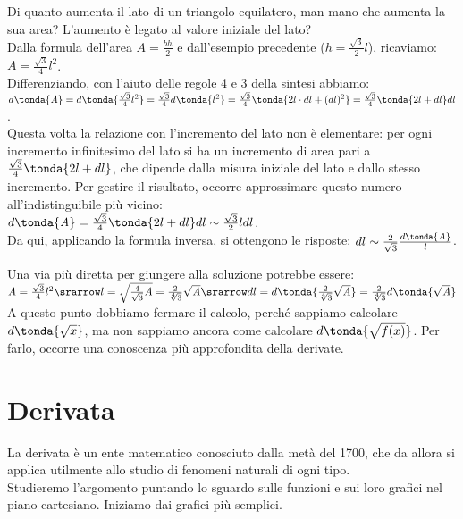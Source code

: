 \begin{esempio}
Di quanto aumenta il lato di un triangolo equilatero,
man mano che aumenta la sua area? L'aumento è legato al valore iniziale del 
lato?\\
Dalla formula dell'area $\mathit{A}=\frac{bh}{2}$ e dall'esempio precedente
($h=\frac{\sqrt{3}}{2}l$), ricaviamo: $\mathit{A}=\frac{\sqrt{3}}{4}l^2$.\\
Differenziando, con l'aiuto delle regole 4 e 3 della sintesi 
abbiamo:\\
$d\tonda{\mathit{A}}=d\tonda{\frac{\sqrt{3}}{4}l^2}=
 \frac{\sqrt{3}}{4}d\tonda{l^2}=
 \frac{\sqrt{3}}{4}\tonda{2l \cdot dl+(dl)^2}=
 \frac{\sqrt{3}}{4}\tonda{2l+dl}dl$.\\
Questa volta la relazione con l'incremento del lato non è elementare: per 
ogni 
incremento infinitesimo del lato si ha un incremento di area pari a 
$\frac{\sqrt{3}}{4}\tonda{2l+dl}$, che dipende dalla misura iniziale del lato
e dallo stesso incremento. Per gestire il risultato, occorre approssimare
questo numero all'indistinguibile più vicino:\\
$d\tonda{\mathit{A}}=\frac{\sqrt{3}}{4}\tonda{2l+dl}dl\sim
\frac{\sqrt{3}}{2}ldl$.\\
Da qui, applicando la formula inversa, si ottengono le 
risposte:
$dl\sim\frac{2}{\sqrt{3}}\frac{d\tonda{\mathit{A}}}{l}$.
\begin{osservazione}
 Una via più diretta per giungere alla soluzione potrebbe essere: \\
 $\mathit{A}=\frac{\sqrt{3}}{4}l^2\srarrow 
l=\sqrt{\frac{4}{\sqrt{3}}\mathit{A}}=
 \frac{2}{\sqrt[4]{3}}\sqrt{\mathit{A}}\srarrow dl=
 d\tonda{\frac{2}{\sqrt[4]{3}}\sqrt{\mathit{A}}}=
 \frac{2}{\sqrt[4]{3}}d\tonda{\sqrt{\mathit{A}}}$\\
 A questo punto dobbiamo fermare il calcolo, perché 
 sappiamo calcolare $d\tonda{\sqrt{x}}$, ma 
 non sappiamo ancora come calcolare $d\tonda{\sqrt{f(x)}}$. Per farlo, 
 occorre una conoscenza più approfondita della derivate.
\end{osservazione}

\end{esempio}
\section{Derivata}
\label{sec:diff01_derivata}
La derivata è un ente matematico conosciuto dalla metà del 1700, che 
da allora si applica utilmente allo studio di fenomeni naturali di ogni 
tipo.\\
Studieremo l'argomento puntando lo sguardo sulle funzioni e sui loro
grafici nel piano cartesiano. Iniziamo dai grafici più semplici.

